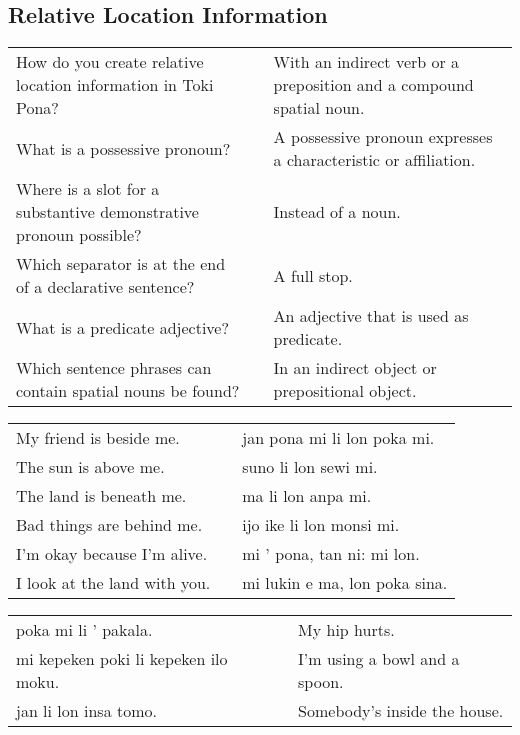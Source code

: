 \newpage
%
\subsection*{Relative Location Information} 
\label{'other_prepositions'}
%
\begin{supertabular}{p{5,5cm}|ll}
How do you create relative location information in Toki Pona? && With an indirect verb or a preposition and a compound spatial noun. \\ %
What is a possessive pronoun? && A possessive pronoun expresses a characteristic or affiliation.  \\ %
Where is a slot for a substantive demonstrative pronoun possible? && Instead of a noun. \\ %
Which separator is at the end of a declarative sentence? && A full stop. \\ %
What is a predicate adjective? && An adjective that is used as predicate. \\ %
Which sentence phrases can contain spatial nouns be found? && In an indirect object or prepositional object.  \\ %
\end{supertabular}

\begin{supertabular}{p{5,5cm}|ll}
My friend is beside me. && jan pona mi li lon poka mi. \\ %
The sun is above me. && suno li lon sewi mi. \\ %
The land is beneath me. && ma li lon anpa mi. \\ %
Bad things are behind me. && ijo ike li lon monsi mi. \\ %
I'm okay because I'm alive. && mi ' pona, tan ni: mi lon. \\ %
I look at the land with you.  && mi lukin e ma, lon poka sina. \\ %
\end{supertabular}  

\begin{supertabular}{p{5,5cm}|ll}
poka mi li ' pakala.  && My hip hurts. \\
mi kepeken poki li kepeken ilo moku.  && I'm using a bowl and a spoon. \\
jan li lon insa tomo.  && Somebody's inside the house. \\
\end{supertabular} 

